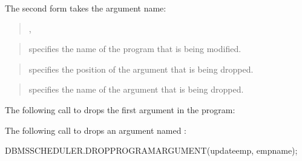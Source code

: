 \documentclass[letterpaper,10pt,english,openany,oneside]{sphinxmanual}
\begin{document}
The second form takes the argument name:
\begin{quote}

\begin{DUlineblock}{0em}
\item[] 
\item[] ,
\item[] 
\end{DUlineblock}
\end{quote}


\begin{quote}

 specifies the name of the program that is being
modified.
\end{quote}

\begin{quote}

 specifies the position of the argument that is
being dropped.
\end{quote}

\begin{quote}

 specifies the name of the argument that is being
dropped.
\end{quote}


The following call to  drops the first argument
in the  program:


The following call to  drops an argument named
:

%
\begin{sphinxVerbatim}[commandchars=\\\{\}]
DBMS\PYGZus{}SCHEDULER.DROP\PYGZus{}PROGRAM\PYGZus{}ARGUMENT(update\PYGZus{}emp\PYGZsq{}, \PYGZsq{}emp\PYGZus{}name\PYGZsq{});
\end{sphinxVerbatim}
\end{document}
